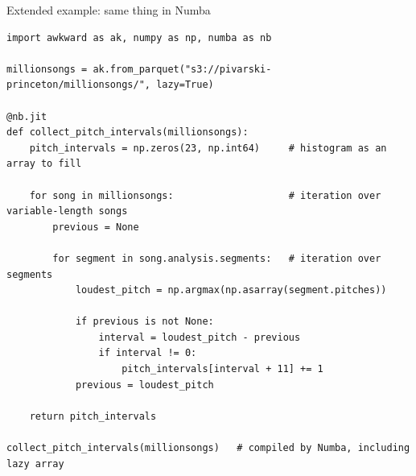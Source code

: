 \documentclass[aspectratio=169]{beamer}
\begin{document}
\begin{frame}[fragile]{Extended example: same thing in Numba}
\vspace{0.2 cm}
\scriptsize
\begin{verbatim}
import awkward as ak, numpy as np, numba as nb

millionsongs = ak.from_parquet("s3://pivarski-princeton/millionsongs/", lazy=True)

@nb.jit
def collect_pitch_intervals(millionsongs):
    pitch_intervals = np.zeros(23, np.int64)     # histogram as an array to fill

    for song in millionsongs:                    # iteration over variable-length songs
        previous = None

        for segment in song.analysis.segments:   # iteration over segments
            loudest_pitch = np.argmax(np.asarray(segment.pitches))

            if previous is not None:
                interval = loudest_pitch - previous
                if interval != 0:
                    pitch_intervals[interval + 11] += 1
            previous = loudest_pitch

    return pitch_intervals

collect_pitch_intervals(millionsongs)   # compiled by Numba, including lazy array
\end{verbatim}
\end{frame}
\end{document}
